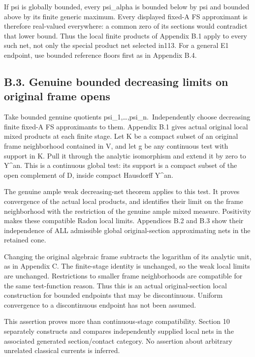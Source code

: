 \documentclass[
  10pt,
]{article}
\begin{document}
If psi is globally bounded, every psi\_alpha is bounded below by psi and
bounded above by its finite generic maximum. Every displayed fixed-A FS
approximant is therefore real-valued everywhere: a common zero of its
sections would contradict that lower bound. Thus the local finite
products of Appendix B.1 apply to every such net, not only the special
product net selected in113. For a general E1 endpoint, use bounded
reference floors first as in Appendix B.4.

\subsection{B.3. Genuine bounded decreasing limits on original frame
opens}\label{b.3.-genuine-bounded-decreasing-limits-on-original-frame-opens}

Take bounded genuine quotients psi\_1,\ldots,psi\_n.~Independently
choose decreasing finite fixed-A FS approximants to them. Appendix B.1
gives actual original local mixed products at each finite stage. Let K
be a compact subset of an original frame neighborhood contained in V,
and let g be any continuous test with support in K. Pull it through the
analytic isomorphism and extend it by zero to Y\^{}an. This is a
continuous global test: its support is a compact subset of the open
complement of D, inside compact Hausdorff Y\^{}an.

The genuine ample weak decreasing-net theorem applies to this test. It
proves convergence of the actual local products, and identifies their
limit on the frame neighborhood with the restriction of the genuine
ample mixed measure. Positivity makes these compatible Radon local
limits. Appendices B.2 and B.3 show their independence of ALL admissible
global original-section approximating nets in the retained cone.

Changing the original algebraic frame subtracts the logarithm of its
analytic unit, as in Appendix C. The finite-stage identity is unchanged,
so the weak local limits are unchanged. Restrictions to smaller frame
neighborhoods are compatible for the same test-function reason. Thus
this is an actual original-section local construction for bounded
endpoints that may be discontinuous. Uniform convergence to a
discontinuous endpoint has not been assumed.

This assertion proves more than continuous-stage compatibility. Section
10 separately constructs and compares independently supplied local nets
in the associated generated section/contact category. No assertion about
arbitrary unrelated classical currents is inferred.
\end{document}
